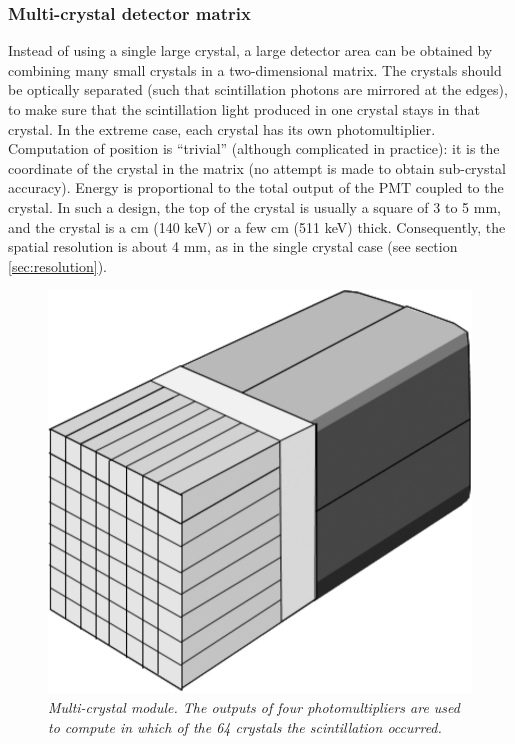 \subsubsection{Multi-crystal detector matrix}
Instead of using a single large crystal, a large detector area can be
obtained by combining many small crystals in a two-dimensional
matrix. The crystals should be optically separated (such that
scintillation photons are mirrored at the edges), to make sure that
the scintillation light produced in one crystal stays in that
crystal. In the extreme case, each crystal has its own
photomultiplier. Computation of position is ``trivial'' (although
complicated in practice): it is the coordinate of the crystal in the
matrix (no attempt is made to obtain sub-crystal accuracy). Energy is
proportional to the total output of the PMT coupled to the crystal. In
such a design, the top of the crystal is usually a square of 3 to 5
mm, and the crystal is a cm (140 keV) or a few cm (511 keV) thick.
Consequently, the spatial resolution is about 4 mm, as in the single
crystal case (see section \ref{sec:resolution}).

\begin{figure}[tb]
\centering
\includegraphics[width=0.6\figone]{figs/fig_multicrystal.pdf}
\caption{\label{fig:multicrystal} \emph{Multi-crystal module. The outputs
of four photomultipliers are used to compute in which of the 64 crystals
the scintillation occurred.}}
\end{figure}

